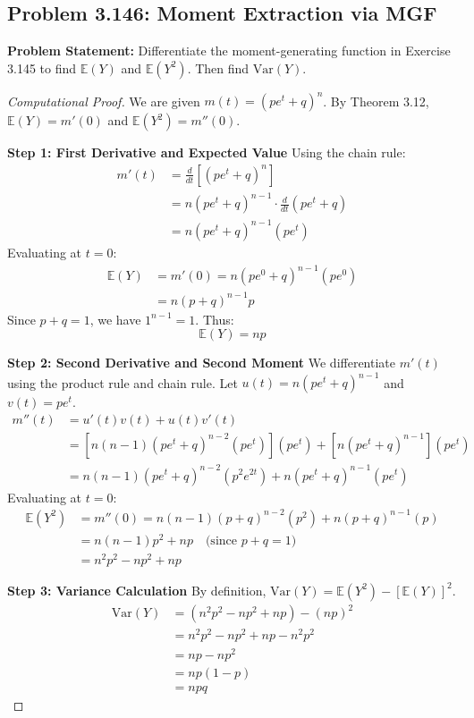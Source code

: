 \documentclass[11pt, a4paper]{article}
\theoremstyle{definition}
\theoremstyle{remark}
\newcommand{\E}{\mathbb{E}}
\newcommand{\Var}{\mathrm{Var}}
\begin{document}
\subsection{Problem 3.146: Moment Extraction via MGF}
\textbf{Problem Statement:} Differentiate the moment-generating function in Exercise 3.145 to find $\E(Y)$ and $\E(Y^2)$. Then find $\Var(Y)$.

\begin{proof}[Computational Proof]
We are given $m(t) = (pe^t + q)^n$. By Theorem 3.12, $\E(Y) = m'(0)$ and $\E(Y^2) = m''(0)$.

\textbf{Step 1: First Derivative and Expected Value}
Using the chain rule:
\begin{align*}
    m'(t) &= \frac{d}{dt} \left[ (pe^t + q)^n \right] \\
          &= n(pe^t + q)^{n-1} \cdot \frac{d}{dt}(pe^t + q) \\
          &= n(pe^t + q)^{n-1} (pe^t)
\end{align*}
Evaluating at $t = 0$:
\begin{align*}
    \E(Y) &= m'(0) = n(pe^0 + q)^{n-1} (pe^0) \\
          &= n(p + q)^{n-1} p
\end{align*}
Since $p + q = 1$, we have $1^{n-1} = 1$. Thus:
\[ \E(Y) = np \]

\textbf{Step 2: Second Derivative and Second Moment}
We differentiate $m'(t)$ using the product rule and chain rule. Let $u(t) = n(pe^t + q)^{n-1}$ and $v(t) = pe^t$.
\begin{align*}
    m''(t) &= u'(t)v(t) + u(t)v'(t) \\
           &= \left[ n(n-1)(pe^t + q)^{n-2}(pe^t) \right] (pe^t) + \left[ n(pe^t + q)^{n-1} \right] (pe^t) \\
           &= n(n-1)(pe^t + q)^{n-2}(p^2 e^{2t}) + n(pe^t + q)^{n-1}(pe^t)
\end{align*}
Evaluating at $t = 0$:
\begin{align*}
    \E(Y^2) &= m''(0) = n(n-1)(p + q)^{n-2}(p^2) + n(p + q)^{n-1}(p) \\
            &= n(n-1)p^2 + np \quad \text{(since } p+q=1 \text{)} \\
            &= n^2p^2 - np^2 + np
\end{align*}

\textbf{Step 3: Variance Calculation}
By definition, $\Var(Y) = \E(Y^2) - [\E(Y)]^2$.
\begin{align*}
    \Var(Y) &= (n^2p^2 - np^2 + np) - (np)^2 \\
            &= n^2p^2 - np^2 + np - n^2p^2 \\
            &= np - np^2 \\
            &= np(1 - p) \\
            &= npq
\end{align*}
\end{proof}
\end{document}
